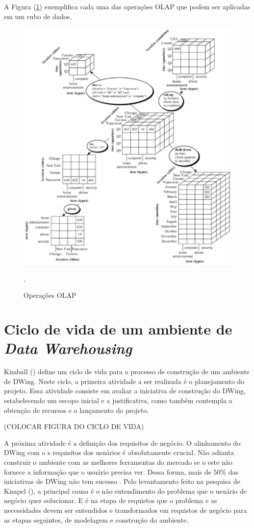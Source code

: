 %

A Figura (\ref{dw-olap}) exemplifica cada uma das operações OLAP que podem ser aplicadas em um cubo de dados.
%
 \begin{figure}[!htb]
 	\centering
 		\includegraphics[scale=1]{figuras/olap}
 		\caption{Operações OLAP}.
 		\label{dw-olap}
 \end{figure}

\section{Ciclo de vida de um ambiente de \emph{Data Warehousing}}
\label{sec-lifecycleDw}
%

Kimball (\citeyear{kimball2002}) define um ciclo de vida para o processo de construção de um ambiente de DWing. Neste ciclo, a primeira atividade a ser realizada é o planejamento do projeto. Essa atividade consiste em avaliar a iniciativa de construção do DWing, estabelecendo um escopo inicial e a justificativa, como também contempla a obtenção  de recursos e o lançamento do projeto.

(COLOCAR FIGURA DO CICLO DE VIDA)
%
%

A próxima atividade é a definição dos requisitos de negócio. O alinhamento do DWing com o s requisitos dos usuários é absolutamente crucial. Não adianta construir o ambiente com as melhores ferramentas do mercado se o este não fornece a informação que o usuário precisa ver. Dessa forma, mais de 50\% das iniciativas de DWing não tem sucesso \cite{sen2011}. Pelo levantamento feito na pesquisa de Kimpel (\citeyear{kimpel2013}), a principal causa é o não entendimento do problema que o usuário de negócio quer solucionar. E é na etapa de requistos que o problema e as necessidades devem ser entendidos e transformados em requistos de negócio para as etapas seguintes, de modelagem e construção do ambiente.

